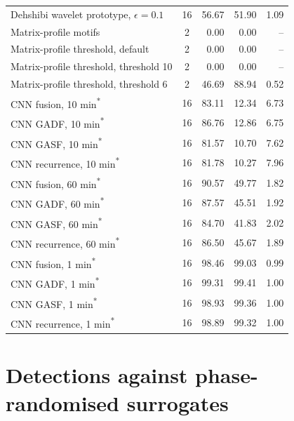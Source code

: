 \begin{longtable}{@{}>{\raggedright\arraybackslash}p{7.0cm} c r r r@{}}
Dehshibi wavelet prototype, $\epsilon=0.1$ & 16 & 56.67 & 51.90 & 1.09\\
\addlinespace
Matrix-profile motifs & 2 & 0.00 & 0.00 & --\\
Matrix-profile threshold, default & 2 & 0.00 & 0.00 & --\\
Matrix-profile threshold, threshold 10 & 2 & 0.00 & 0.00 & --\\
Matrix-profile threshold, threshold 6 & 2 & 46.69 & 88.94 & 0.52\\
\addlinespace
CNN fusion, 10 min\textsuperscript{*} & 16 & 83.11 & 12.34 & 6.73\\
CNN GADF, 10 min\textsuperscript{*} & 16 & 86.76 & 12.86 & 6.75\\
CNN GASF, 10 min\textsuperscript{*} & 16 & 81.57 & 10.70 & 7.62\\
CNN recurrence, 10 min\textsuperscript{*} & 16 & 81.78 & 10.27 & 7.96\\
\addlinespace
CNN fusion, 60 min\textsuperscript{*} & 16 & 90.57 & 49.77 & 1.82\\
CNN GADF, 60 min\textsuperscript{*} & 16 & 87.57 & 45.51 & 1.92\\
CNN GASF, 60 min\textsuperscript{*} & 16 & 84.70 & 41.83 & 2.02\\
CNN recurrence, 60 min\textsuperscript{*} & 16 & 86.50 & 45.67 & 1.89\\
\addlinespace
CNN fusion, 1 min\textsuperscript{*} & 16 & 98.46 & 99.03 & 0.99\\
CNN GADF, 1 min\textsuperscript{*} & 16 & 99.31 & 99.41 & 1.00\\
CNN GASF, 1 min\textsuperscript{*} & 16 & 98.93 & 99.36 & 1.00\\
CNN recurrence, 1 min\textsuperscript{*} & 16 & 98.89 & 99.32 & 1.00\\
\end{longtable}
\endgroup

\section*{Detections against phase-randomised surrogates}

